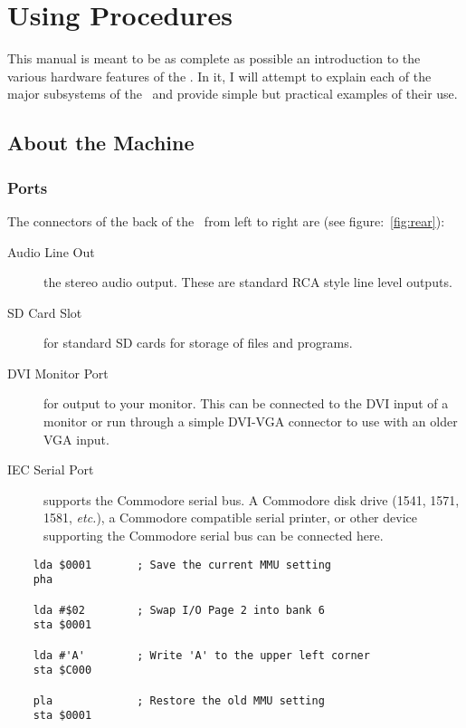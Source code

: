 \chapter{Using Procedures}

This manual is meant to be as complete as possible an introduction to the various hardware features of the \jr. In it, I will attempt to explain each of the major subsystems of the \jr\ and provide simple but practical examples of their use.

\section*{About the Machine}

\subsection*{Ports}

The connectors of the back of the \jr\ from left to right are (see figure:~\ref{fig:rear}):

\begin{description}
    \item[Audio Line Out] the stereo audio output. These are standard RCA style line level outputs.

    \item[SD Card Slot] for standard SD cards for storage of files and programs.

    \item[DVI Monitor Port] for output to your monitor. This can be connected to the DVI input of a monitor or run through a simple DVI-VGA connector to use with an older VGA input.

    \item[IEC Serial Port] supports the Commodore serial bus. A Commodore disk drive (1541, 1571, 1581, {\it etc.}), a Commodore compatible serial printer, or other device supporting the Commodore serial bus can be connected here.
\end{description}


\begin{verbatim}
    lda $0001       ; Save the current MMU setting
    pha

    lda #$02        ; Swap I/O Page 2 into bank 6
    sta $0001

    lda #'A'        ; Write 'A' to the upper left corner
    sta $C000

    pla             ; Restore the old MMU setting
    sta $0001
\end{verbatim}